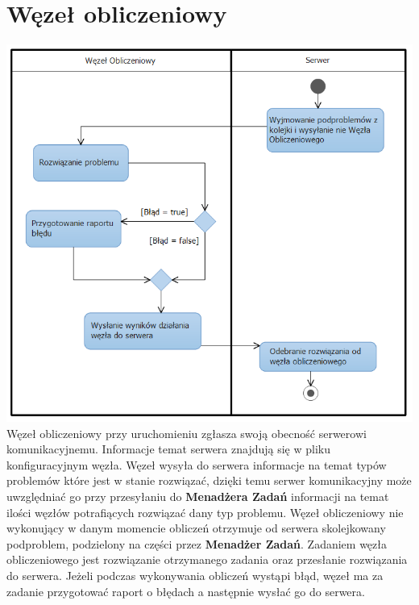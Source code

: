 \documentclass[12pt,a4paper,titlepage]{report}
\begin{document}
		\section{Węzeł obliczeniowy}
		\includegraphics[width=\textwidth]{img/diagram3.png}
		Węzeł obliczeniowy przy uruchomieniu zgłasza swoją obecność serwerowi komunikacyjnemu. Informacje temat serwera 
znajdują się w pliku konfiguracyjnym węzła. Węzeł wysyła do serwera informacje na temat typów problemów które jest w stanie 
rozwiązać, dzięki temu serwer komunikacyjny może uwzględniać go przy przesyłaniu do \textbf{Menadżera Zadań} informacji na temat
ilości węzłów potrafiących rozwiązać dany typ problemu. \linebreak
Węzeł obliczeniowy nie wykonujący w danym momencie obliczeń otrzymuje od serwera skolejkowany podproblem, podzielony 
na części przez \textbf{Menadżer Zadań}. Zadaniem węzła obliczeniowego jest rozwiązanie otrzymanego zadania oraz przesłanie
rozwiązania do serwera. Jeżeli podczas wykonywania obliczeń wystąpi błąd, węzeł ma za zadanie przygotować raport o 
błędach a następnie wysłać go do serwera.
\end{document}
